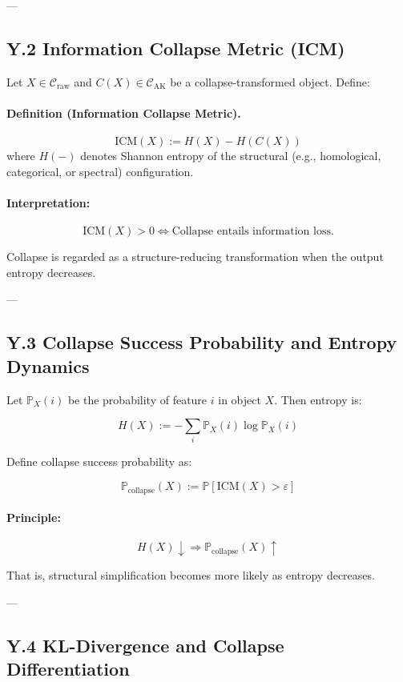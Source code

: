 \documentclass[11pt]{article}
\begin{document}
---

\subsection*{Y.2 Information Collapse Metric (ICM)}

Let \( X \in \mathcal{C}_{\mathrm{raw}} \) and \( C(X) \in \mathcal{C}_{\mathrm{AK}} \) be a collapse-transformed object. Define:

\paragraph{Definition (Information Collapse Metric).}
\[
\mathrm{ICM}(X) := H(X) - H(C(X))
\]
where \( H(-) \) denotes Shannon entropy of the structural (e.g., homological, categorical, or spectral) configuration.

\paragraph{Interpretation:}
\[
\mathrm{ICM}(X) > 0 \iff \text{Collapse entails information loss.}
\]

Collapse is regarded as a structure-reducing transformation when the output entropy decreases.

---

\subsection*{Y.3 Collapse Success Probability and Entropy Dynamics}

Let \( \mathbb{P}_X(i) \) be the probability of feature \( i \) in object \( X \). Then entropy is:

\[
H(X) := - \sum_{i} \mathbb{P}_X(i) \log \mathbb{P}_X(i)
\]

Define collapse success probability as:

\[
\mathbb{P}_{\mathrm{collapse}}(X) := \mathbb{P}[\mathrm{ICM}(X) > \varepsilon]
\]

\paragraph{Principle:}
\[
H(X) \downarrow \Rightarrow \mathbb{P}_{\mathrm{collapse}}(X) \uparrow
\]

That is, structural simplification becomes more likely as entropy decreases.

---

\subsection*{Y.4 KL-Divergence and Collapse Differentiation}
\end{document}
